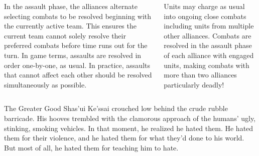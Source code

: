 \documentclass{40k}
\begin{document}
\begin{columns}

In the assault phase, the alliances alternate selecting combats to be
resolved beginning with the currently active team.  This ensures the
current team cannot solely resolve their preferred combats before time
runs out for the turn.  In game terms, assaults are resolved in order
one-by-one, as usual. In practice, assaults that cannot affect each
other should be resolved simultaneously as possible.

Units may charge as usual into ongoing close combats including units
from multiple other alliances.  Combats are resolved in the assault
phase of each alliance with engaged units, making combats with more
than two alliances particularly deadly!

\end{columns}

\vfill
\begin{story}{0.35in}{The Greater Good}
  Shas'ui Ke'ssai crouched low behind the crude rubble barricade.  His
  hooves trembled with the clamorous approach of the humans' ugly,
  stinking, smoking vehicles.  In that moment, he realized he hated
  them.  He hated them for their violence, and he hated them for what
  they'd done to his world.  But most of all, he hated them for
  teaching him to hate.
\end{story}


\end{document}
